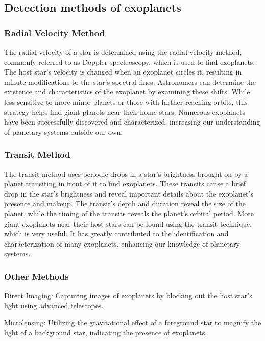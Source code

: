 \documentclass{article}
\begin{document}
\subsection{Detection methods of exoplanets}

\subsubsection{Radial Velocity Method}

The radial velocity of a star is determined using the radial velocity method, commonly referred to as Doppler spectroscopy, which is used to find exoplanets. The host star's velocity is changed when an exoplanet circles it, resulting in minute modifications to the star's spectral lines. Astronomers can determine the existence and characteristics of the exoplanet by examining these shifts. While less sensitive to more minor planets or those with farther-reaching orbits, this strategy helps find giant planets near their home stars. Numerous exoplanets have been successfully discovered and characterized, increasing our understanding of planetary systems outside our own.

\subsubsection{Transit Method}

The transit method uses periodic drops in a star's brightness brought on by a planet transiting in front of it to find exoplanets. These transits cause a brief drop in the star's brightness and reveal important details about the exoplanet's presence and makeup. The transit's depth and duration reveal the size of the planet, while the timing of the transits reveals the planet's orbital period. More giant exoplanets near their host stars can be found using the transit technique, which is very useful. It has greatly contributed to the identification and characterization of many exoplanets, enhancing our knowledge of planetary systems.

\subsubsection{Other Methods}

Direct Imaging: Capturing images of exoplanets by blocking out the host star's light using advanced telescopes.

Microlensing: Utilizing the gravitational effect of a foreground star to magnify the light of a background star, indicating the presence of exoplanets.
\end{document}
